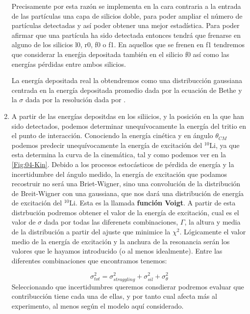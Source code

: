 \begin{enumerate}
    Precisamente por esta razón se implementa en la cara contraria a la entrada de las partículas una capa de silicios doble, para poder ampliar el número de partículas detectadas y así poder obtener una mejor estadística. Para poder afirmar que una partícula ha sido detectada entonces tendrá que frenarse en alguno de los silicios l0, r0, f0 o f1. En aquellos que se frenen en f1 tendremos que considerar la enerǵia depositada también en el silicio f0 así como las energías pérdidas entre ambos silicios.

    La energía depositada real la obtendremos como una distribucción gaussiana centrada en la energía depositada promedio dada por la ecuación de Bethe y la $\sigma$ dada por la resolución dada por \label{Eq:Resolucion_Silicios}.

    \item A partir de las energías depositdas en los siliicios, y la posición en la que han sido detectados, podemos determinar unequívocamente la energía del tritio en el punto de interacción. Conociendo la energía cinética y en ángulo $\theta_{CM}$ podemos predecir unequívocamente la energía de excitación del $^{10}$Li, ya que esta determina la curva de la cinemática, tal y como podemos ver en la \cref{Fig:04-Kin}. Debido a los procesos estocásticos de pérdida de energía y la incertidumbre del ángulo medido, la energía de excitación que podamos recostruir no será una Briet-Wigner, sino una convolución de la distribución de Breit-Wigner con una gaussiana, que nos dará una distribución de energía de excitación del $^{10}$Li. Esta es la llamada \textbf{función Voigt}. A partir de esta distrbución podremos obtener el valor de la energía de excitación, cual es el valor de $\sigma$ dada por todas las diferenets combinaciones, $\Gamma$, la altura y media de la distribución a partir del ajuste que minimice la $\chi^2$. Lógicamente el valor medio de la energía de excitación y la anchura de la resonancia serán los valores que le hayamos introducido (o al menos idealmente). Entre las diferentes combinaciones que encontramos tenemos:
    
    \begin{equation}
        \sigma_{tot}^2 = \sigma_{straggling}^2 + \sigma_{sil}^2 + \sigma_{\theta}^2 
    \end{equation}
    Seleccionando que incertidumbres queremos consdierar podremos evaluar que contribucción tiene cada una de ellas, y por tanto cual afecta más al experimento, al menos según el modelo aquí considerado. 

\end{enumerate}    
